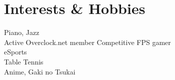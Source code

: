 \documentclass[]{peter_resume}
\begin{document}
\begin{minipage}[t]{0.33\textwidth}

\section{Interests \& Hobbies} 
Piano, Jazz \\
Active Overclock.net member
Competitive FPS gamer \\
eSports \\
Table Tennis \\
Anime, Gaki no Tsukai \\
\sectionsep



\end{minipage} 
\hfill
\end{document}
